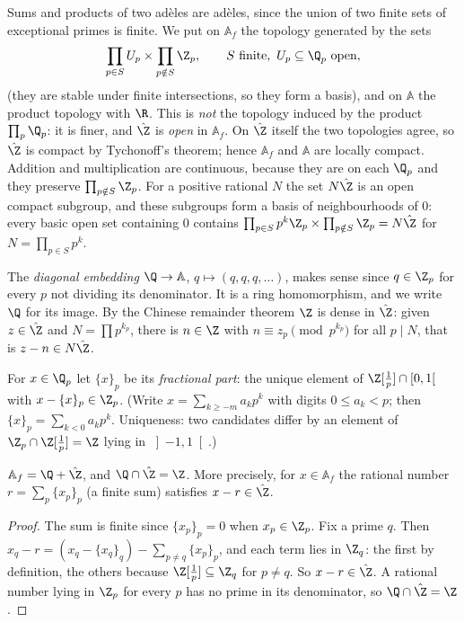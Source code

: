 Sums and products of two ad\`eles are ad\`eles, since the union of two finite sets of exceptional primes is finite. We put on $\mathbb{A}_f$
the topology generated by the sets
\[
\prod_{p\in S}U_p\times\prod_{p\notin S}\Z_p,\qquad S\text{ finite},\ U_p\subseteq\Q_p\text{ open},
\]
(they are stable under finite intersections, so they form a basis), and on $\mathbb{A}$ the product topology with $\R$. This is
\emph{not} the topology induced by the product $\prod_p\Q_p$: it is finer, and $\hat{\Z}$ is \emph{open} in $\mathbb{A}_f$. On $\hat{\Z}$ itself the
two topologies agree, so $\hat{\Z}$ is compact by Tychonoff's theorem; hence $\mathbb{A}_f$ and $\mathbb{A}$ are locally compact. Addition and
multiplication are continuous, because they are on each $\Q_p$ and they preserve $\prod_{p\notin S}\Z_p$. For a positive rational
$N$ the set $N\hat{\Z}$ is an open compact subgroup, and these subgroups form a basis of neighbourhoods of $0$: every basic open set
containing $0$ contains $\prod_{p\in S}p^k\Z_p\times\prod_{p\notin S}\Z_p=N\hat{\Z}$ for $N=\prod_{p\in S}p^k$.

The \emph{diagonal embedding} $\Q\to\mathbb{A}$, $q\mapsto(q,q,q,\dots)$, makes sense since $q\in\Z_p$ for every $p$ not dividing its
denominator. It is a ring homomorphism, and we write $\Q$ for its image. By the Chinese remainder theorem $\Z$ is dense in $\hat{\Z}$:
given $z\in\hat{\Z}$ and $N=\prod p^{k_p}$, there is $n\in\Z$ with $n\equiv z_p\pmod{p^{k_p}}$ for all $p\mid N$, that is
$z-n\in N\hat{\Z}$.

For $x\in\Q_p$ let $\{x\}_p$ be its \emph{fractional part}: the unique element of $\Z[\frac1p]\cap\left[0,1\right[$ with
$x-\{x\}_p\in\Z_p$. (Write $x=\sum_{k\ge-m}a_kp^k$ with digits $0\le a_k<p$; then $\{x\}_p=\sum_{k<0}a_kp^k$. Uniqueness: two
candidates differ by an element of $\Z_p\cap\Z[\frac1p]=\Z$ lying in $\left]-1,1\right[$.)

\begin{lemma}\label{lem:AfQZ}
$\mathbb{A}_f=\Q+\hat{\Z}$, and $\Q\cap\hat{\Z}=\Z$. More precisely, for $x\in\mathbb{A}_f$ the rational number $r=\sum_p\{x_p\}_p$ (a finite sum)
satisfies $x-r\in\hat{\Z}$.
\end{lemma}
\begin{proof}
The sum is finite since $\{x_p\}_p=0$ when $x_p\in\Z_p$. Fix a prime $q$. Then $x_q-r=(x_q-\{x_q\}_q)-\sum_{p\ne q}\{x_p\}_p$, and
each term lies in $\Z_q$: the first by definition, the others because $\Z[\frac1p]\subseteq\Z_q$ for $p\ne q$. So $x-r\in\hat{\Z}$. A
rational number lying in $\Z_p$ for every $p$ has no prime in its denominator, so $\Q\cap\hat{\Z}=\Z$.
\end{proof}

